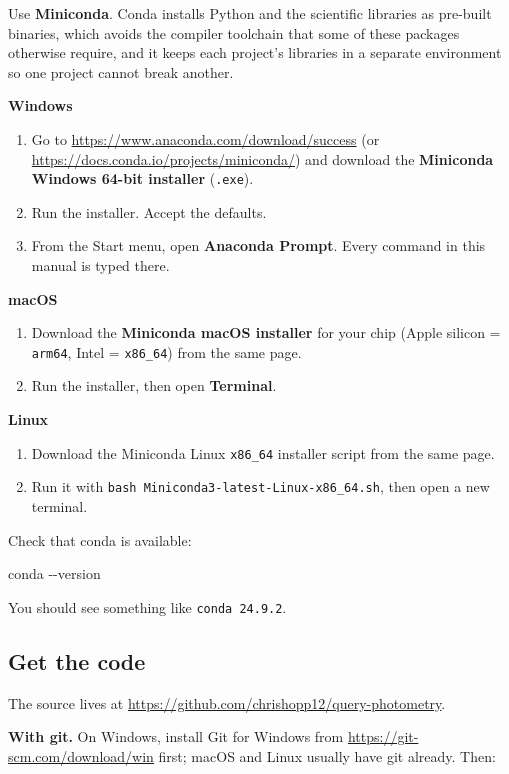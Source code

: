 \documentclass[11pt]{article}
\newcommand{\cmdline}[1]{\begin{cmd}\ttfamily #1\end{cmd}}
\begin{document}
Use \textbf{Miniconda}. Conda installs Python and the scientific
libraries as pre-built binaries, which avoids the compiler toolchain that
some of these packages otherwise require, and it keeps each project's
libraries in a separate environment so one project cannot break another.

\textbf{Windows}
\begin{enumerate}\sloppy
  \item Go to \url{https://www.anaconda.com/download/success} (or
        \url{https://docs.conda.io/projects/miniconda/}) and download the
        \textbf{Miniconda Windows 64-bit installer} (\texttt{.exe}).
  \item Run the installer. Accept the defaults.
  \item From the Start menu, open \textbf{Anaconda Prompt}. Every command
        in this manual is typed there.
\end{enumerate}

\textbf{macOS}
\begin{enumerate}
  \item Download the \textbf{Miniconda macOS installer} for your chip
        (Apple silicon = \texttt{arm64}, Intel = \texttt{x86\_64}) from
        the same page.
  \item Run the installer, then open \textbf{Terminal}.
\end{enumerate}

\textbf{Linux}
\begin{enumerate}
  \item Download the Miniconda Linux \texttt{x86\_64} installer script
        from the same page.
  \item Run it with \texttt{bash Miniconda3-latest-Linux-x86\_64.sh},
        then open a new terminal.
\end{enumerate}

Check that conda is available:

\cmdline{conda -{}-version}

You should see something like \texttt{conda 24.9.2}.

\subsection{Get the code}

The source lives at \url{https://github.com/chrishopp12/query-photometry}.

\textbf{With git.} On Windows, install Git for Windows from
\url{https://git-scm.com/download/win} first; macOS and Linux usually
have git already. Then:
\end{document}
